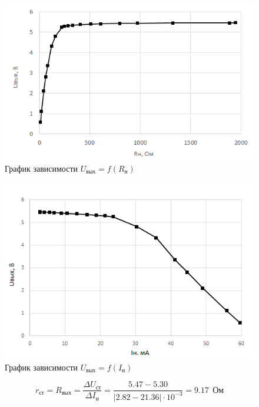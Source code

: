 \begin{figure}[H]
	\begin{center}
		\includegraphics[width=14cm]{img/2}
		\caption{График зависимости $U_\text{вых} = f(R_\text{н})$}
		\label{graphic:5:2} %
	\end{center}
\end{figure}

\begin{figure}[H]
	\begin{center}
		\includegraphics[width=14cm]{img/3}
		\caption{График зависимости $U_\text{вых} = f(I_\text{н})$}
		\label{graphic:5:3} %
	\end{center}
\end{figure}

\begin{displaymath}
r_\text{ст} = R_\text{вых} = \frac{\Delta U_\text{ст}}{\Delta I_\text{н}} = \frac{5.47 - 5.30}{| 2.82 - 21.36 | \cdot 10^{-3}} = 9.17 \ \ \text{Ом}
\end{displaymath}

